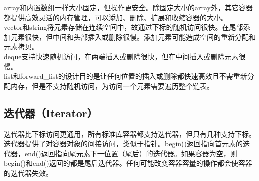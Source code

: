 array和内置数组一样大小固定，但操作更安全。除固定大小的array外，其它容器都提供高效灵活的内存管理，可以添加、删除、扩展和收缩容器的大小。\\

vector和string将元素存储在连续空间中，故通过下标的随机访问很快。在尾部添加元素很快，但中间和头部插入或删除很慢。添加元素可能造成空间的重新分配和元素拷贝。\\

deque支持快速随机访问，在两端插入或删除很快，但在中间插入或删除元素很慢。\\

list和forward\_list的设计目的是让任何位置的插入或删除都快速高效且不需重新分配内存，但是不支持随机访问，为访问一个元素需要遍历整个链表。\\

\subsection{迭代器（Iterator）}

迭代器比下标访问更通用，所有标准库容器都支持迭代器，但只有几种支持下标。迭代器提供了对容器对象的间接访问，类似于指针。begin()返回指向首元素的迭代器，end()返回指向尾元素下一位置（尾后）的迭代器。如果容器为空，则begin()和end()返回的都是尾后迭代器。任何可能改变容器容量的操作都会使容器的迭代器失效。

\begin{table}[H]
	\centering
	\caption{迭代器}
\end{table}

